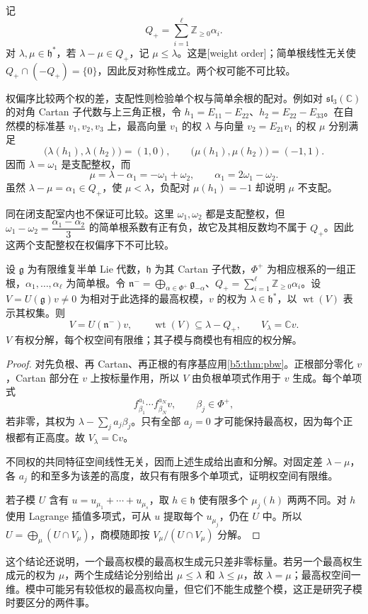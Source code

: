记
\[
	Q_+=\sum_{i=1}^\ell\mathbb Z_{\ge0}\alpha_i.
\]
对 \(\lambda,\mu\in\mathfrak h^*\)，若 \(\lambda-\mu\in Q_+\)，记 \(\mu\le\lambda\)。这是[weight order]；简单根线性无关使 \(Q_+\cap(-Q_+)=\{0\}\)，因此反对称性成立。两个权可能不可比较。

权偏序比较两个权的差，支配性则检验单个权与简单余根的配对。例如对 \(\mathfrak{sl}_3(\mathbb C)\) 的对角 Cartan 子代数与上三角正根，令 \(h_1=E_{11}-E_{22}\)、\(h_2=E_{22}-E_{33}\)。在自然模的标准基 \(v_1,v_2,v_3\) 上，最高向量 \(v_1\) 的权 \(\lambda\) 与向量 \(v_2=E_{21}v_1\) 的权 \(\mu\) 分别满足
\[
	\bigl(\lambda(h_1),\lambda(h_2)\bigr)=(1,0),\qquad \bigl(\mu(h_1),\mu(h_2)\bigr)=(-1,1).
\]
因而 \(\lambda=\omega_1\) 是支配整权，而
\[
	\mu=\lambda-\alpha_1=-\omega_1+\omega_2,\qquad \alpha_1=2\omega_1-\omega_2.
\]
虽然 \(\lambda-\mu=\alpha_1\in Q_+\)，使 \(\mu<\lambda\)，负配对 \(\mu(h_1)=-1\) 却说明 \(\mu\) 不支配。

\ProseParagraphBreak

同在闭支配室内也不保证可比较。这里 \(\omega_1,\omega_2\) 都是支配整权，但 \(\omega_1-\omega_2=\dfrac{\alpha_1-\alpha_2}{3}\) 的简单根系数有正有负，故它及其相反数均不属于 \(Q_+\)。因此这两个支配整权在权偏序下不可比较。

\begin{proposition}\label{b5:prop:highest-weight-support}
	设 \(\mathfrak g\) 为有限维复半单 Lie 代数，\(\mathfrak h\) 为其 Cartan 子代数，\(\Phi^+\) 为相应根系的一组正根，\(\alpha_1,\ldots,\alpha_\ell\) 为简单根。令 \(\mathfrak n^-=\bigoplus_{\alpha\in\Phi^+}\mathfrak g_{-\alpha}\)、\(Q_+=\sum_{i=1}^\ell\mathbb Z_{\ge0}\alpha_i\)。设 \(V=U(\mathfrak g)v\ne0\) 为相对于此选择的最高权模，\(v\) 的权为 \(\lambda\in\mathfrak h^*\)，以 \(\operatorname{wt}(V)\) 表示其权集。则
	\[
		V=U(\mathfrak n^-)v,\qquad \operatorname{wt}(V)\subseteq\lambda-Q_+,\qquad V_\lambda=\mathbb Cv.
	\]
	\(V\) 有权分解，每个权空间有限维；其子模与商模也有相应的权分解。
\end{proposition}
\begin{proof}
	对先负根、再 Cartan、再正根的有序基应用\cref{b5:thm:pbw}。正根部分零化 \(v\)，Cartan 部分在 \(v\) 上按标量作用，所以 \(V\) 由负根单项式作用于 \(v\) 生成。每个单项式
	\[
		f_{\beta_1}^{a_1}\cdots f_{\beta_N}^{a_N}v, \qquad \beta_j\in\Phi^+,
	\]
	若非零，其权为 \(\lambda-\sum_j a_j\beta_j\)。只有全部 \(a_j=0\) 才可能保持最高权，因为每个正根都有正高度。故 \(V_\lambda=\mathbb Cv\)。

	不同权的共同特征空间线性无关，因而上述生成给出直和分解。对固定差 \(\lambda-\mu\)，各 \(a_j\) 的和至多为该差的高度，故只有有限多个单项式，证明权空间有限维。

	若子模 \(U\) 含有 \(u=u_{\mu_1}+\cdots+u_{\mu_s}\)，取 \(h\in\mathfrak h\) 使有限多个 \(\mu_j(h)\) 两两不同。对 \(h\) 使用 Lagrange 插值多项式，可从 \(u\) 提取每个 \(u_{\mu_j}\)，仍在 \(U\) 中。所以 \(U=\bigoplus_\mu(U\cap V_\mu)\)，商模随即按 \(V_\mu/(U\cap V_\mu)\) 分解。
\end{proof}

这个结论还说明，一个最高权模的最高权生成元只差非零标量。若另一个最高权生成元的权为 \(\mu\)，两个生成结论分别给出 \(\mu\le\lambda\) 和 \(\lambda\le\mu\)，故 \(\lambda=\mu\)；最高权空间一维。模中可能另有较低权的最高权向量，但它们不能生成整个模，这正是研究子模时要区分的两件事。
